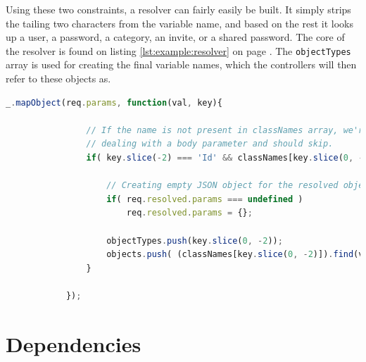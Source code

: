 		Using these two constraints, a resolver can fairly easily be built. It simply strips the tailing two characters from the variable name, and based on the rest it looks up a user, a password, a category, an invite, or a shared password. The core of the resolver is found on listing \ref{lst:example:resolver} on page \pageref{lst:example:resolver}. The \verb=objectTypes= array is used for creating the final variable names, which the controllers will then refer to these objects as.

		\begin{lstlisting}[gobble=12,language=JavaScript,caption={Object resolver middleware},label={lst:example:resolver}]
            _.mapObject(req.params, function(val, key){
            
                // If the name is not present in classNames array, we're
                // dealing with a body parameter and should skip.
                if( key.slice(-2) === 'Id' && classNames[key.slice(0, -2)] !== undefined ){
                    
                    // Creating empty JSON object for the resolved objects to be placed in
                    if( req.resolved.params === undefined ) 
                        req.resolved.params = {};
                    
                    objectTypes.push(key.slice(0, -2));
                    objects.push( (classNames[key.slice(0, -2)]).find(val) );
                }
            
            });
		\end{lstlisting}

	\section{Dependencies}
